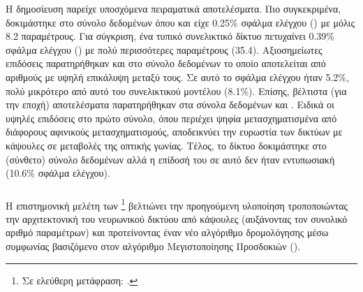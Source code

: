 Η δημοσίευση  παρείχε υποσχόμενα πειραματικά αποτελέσματα. Πιο συγκεκριμένα, δοκιμάστηκε στο σύνολο δεδομένων \cite{lecun1998gradientMNIST} όπου και είχε 0.25\% σφάλμα ελέγχου () με μόλις 8.2 παραμέτρους. Για σύγκριση, ένα τυπικό  συνελικτικό δίκτυο πετυχαίνει 0.39\% σφάλμα ελέγχου () με πολύ περισσότερες παραμέτρους (35.4). Αξιοσημείωτες επιδόσεις παρατηρήθηκαν και στο \cite{sabour2017dynamic} σύνολο δεδομένων το οποίο αποτελείται από αριθμούς με υψηλή επικάλυψη μεταξύ τους. Σε αυτό το σφάλμα ελέγχου ήταν 5.2\%, πολύ μικρότερο από αυτό του συνελικτικού μοντέλου (8.1\%). Επίσης, βέλτιστα (για την εποχή) αποτελέσματα παρατηρήθηκαν στα σύνολα δεδομένων  και . Ειδικά οι υψηλές επιδόσεις στο πρώτο σύνολο, όπου περιέχει ψηφία μετασχηματισμένα από διάφορους αφινικούς μετασχηματισμούς, αποδεικνύει την ευρωστία των δικτύων με κάψουλες σε μεταβολές της οπτικής γωνίας. Τέλος, το δίκτυο δοκιμάστηκε στο (σύνθετο) σύνολο δεδομένων  αλλά η επίδοσή του σε αυτό δεν ήταν εντυπωσιακή (10.6\% σφάλμα ελέγχου).

\subsubsection{}

Η επιστημονική μελέτη των \footnote{Σε ελεύθερη μετάφραση: .}\cite{hinton2018matrix} βελτιώνει την προηγούμενη υλοποίηση τροποποιώντας την αρχιτεκτονική του νευρωνικού δικτύου από κάψουλες (αυξάνοντας τον συνολικό αριθμό παραμέτρων) και προτείνοντας έναν νέο αλγόριθμο δρομολόγησης μέσω συμφωνίας βασιζόμενο στον αλγόριθμο Μεγιστοποίησης Προσδοκιών (). \par

